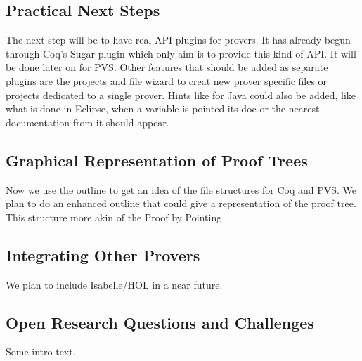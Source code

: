 \documentclass{entcs}
\begin{document}
\subsection{Practical Next Steps}
\label{subsec:practical-next-steps}

The next step will be to have real API plugins for provers. 
It has already begun through Coq's Sugar plugin which only aim 
is to provide this kind of API.
It will be done later on for PVS. Other features that should be added
as separate plugins are the projects and file wizard to creat 
new prover specific files or projects dedicated to a single prover.
Hints like for Java could also be added, like what is done in Eclipse, 
when a variable is pointed its doc or the nearest documentation 
from it should appear. 


\subsection{Graphical Representation of Proof Trees}
\label{subsec:graph-repr-proof}

Now we use the outline to get an idea of the file structures for Coq and PVS.
We plan to do an enhanced outline that could give a representation
of the proof tree. This structure more akin of the Proof by Pointing
\cite{bertot94proof}.


\subsection{Integrating Other Provers}
\label{subsec:integr-other-prov}

We plan to include Isabelle/HOL in a near future.

\subsection{Open Research Questions and Challenges}
\label{subsec:open-rese-quest}

Some intro text.



%


\end{document}
